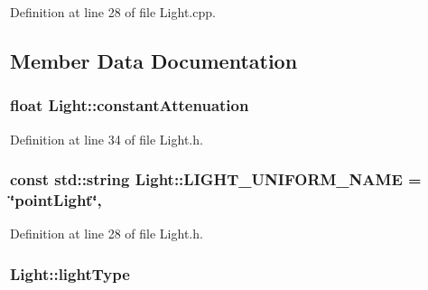 Definition at line 28 of file Light.\+cpp.



\subsection{Member Data Documentation}
\hypertarget{class_light_afef6c00a21aa16dc6cc7a7fb1639d2fa}{}
\subsubsection[{constant\+Attenuation}]{\setlength{\rightskip}{0pt plus 5cm}float Light\+::constant\+Attenuation\hspace{0.3cm}{\ttfamily [private]}}\label{class_light_afef6c00a21aa16dc6cc7a7fb1639d2fa}


Definition at line 34 of file Light.\+h.

\hypertarget{class_light_ab2d40f6c364cf728d03a90ff885e37cb}{}
\subsubsection[{L\+I\+G\+H\+T\+\_\+\+U\+N\+I\+F\+O\+R\+M\+\_\+\+N\+A\+M\+E}]{\setlength{\rightskip}{0pt plus 5cm}const std\+::string Light\+::\+L\+I\+G\+H\+T\+\_\+\+U\+N\+I\+F\+O\+R\+M\+\_\+\+N\+A\+M\+E = \char`\"{}point\+Light\char`\"{}\hspace{0.3cm}{\ttfamily [static]}, {\ttfamily [private]}}\label{class_light_ab2d40f6c364cf728d03a90ff885e37cb}


Definition at line 28 of file Light.\+h.

\hypertarget{class_light_ab0c279c927973443f7b52fc924b489aa}{}
\subsubsection[{light\+Type}]{ Light\+::light\+Type\hspace{0.3cm}{\ttfamily [private]}}\label{class_light_ab0c279c927973443f7b52fc924b489aa}


